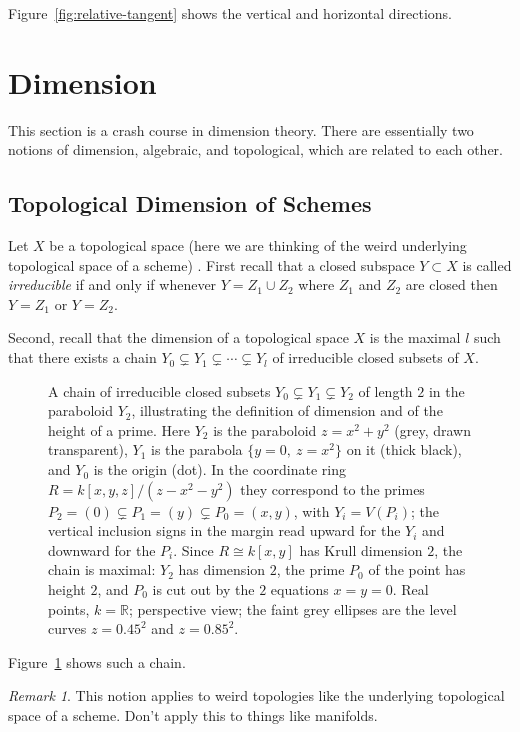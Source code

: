 \documentclass[12pt]{article}
\numberwithin{equation}{section}
\theoremstyle{definition}
\theoremstyle{remark}
\newtheorem{remark}[theorem]{Remark}
\newcommand{\RR}{\mathbb{R}}
\begin{document}
Figure~\ref{fig:relative-tangent} shows the vertical and horizontal directions.

\section{Dimension}
This section is a crash course in dimension theory. 
There are essentially two notions of dimension, algebraic, and topological, which are related to each other. 
\subsection{Topological Dimension of Schemes}

Let $X$ be a topological space (here we are thinking of the weird underlying topological space of a scheme) . First recall that a closed subspace $Y\subset X$ is called \emph{irreducible} if and only if whenever $Y = Z_1 \cup Z_2$ where $Z_1$ and $Z_2$ are closed then $Y=Z_1$ or $Y=Z_2$.

Second, recall that the dimension of a topological space $X$ is the maximal $l$ such that there exists a chain $Y_0 \subsetneq Y_1 \subsetneq \cdots \subsetneq Y_l$ of irreducible closed subsets of $X$. 

\begin{figure}[H]
\centering

\caption{A chain of irreducible closed subsets $Y_0\subsetneq Y_1\subsetneq Y_2$ of length $2$ in the paraboloid $Y_2$, illustrating the definition of dimension and of the height of a prime. Here $Y_2$ is the paraboloid $z=x^2+y^2$ (grey, drawn transparent), $Y_1$ is the parabola $\{y=0,\ z=x^2\}$ on it (thick black), and $Y_0$ is the origin (dot). In the coordinate ring $R=k[x,y,z]/(z-x^2-y^2)$ they correspond to the primes $P_2=(0)\subsetneq P_1=(y)\subsetneq P_0=(x,y)$, with $Y_i=V(P_i)$; the vertical inclusion signs in the margin read upward for the $Y_i$ and downward for the $P_i$. Since $R\cong k[x,y]$ has Krull dimension $2$, the chain is maximal: $Y_2$ has dimension $2$, the prime $P_0$ of the point has height $2$, and $P_0$ is cut out by the $2$ equations $x=y=0$. Real points, $k=\RR$; perspective view; the faint grey ellipses are the level curves $z=0.45^2$ and $z=0.85^2$.}\label{fig:paraboloid-chain}
\end{figure}
Figure~\ref{fig:paraboloid-chain} shows such a chain.

\begin{remark}
	This notion applies to weird topologies like the underlying topological space of a scheme. Don't apply this to things like manifolds. 
\end{remark}
\end{document}
